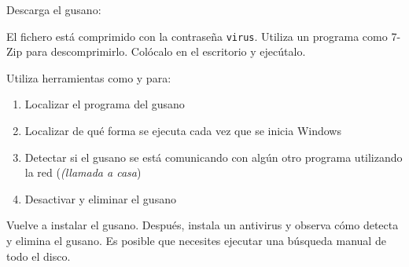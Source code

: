 \begin{homeworkProblem}
  Descarga el gusano:

  \begin{center}
    \begin{minipage}{.8\textwidth}
      \begin{center}
      \end{center}
    \end{minipage}
  \end{center}
  

  El fichero está comprimido con la contraseña \texttt{virus}. Utiliza un programa como 7-Zip para descomprimirlo. Colócalo en el escritorio y ejecútalo.
\end{homeworkProblem}

\begin{homeworkProblem}
  Utiliza herramientas como  y  para:
  \begin{enumerate}
  \item Localizar el programa del gusano
  \item Localizar de qué forma se ejecuta cada vez que se inicia Windows
  \item Detectar si el gusano se está comunicando con algún otro programa utilizando la red (\textit{(llamada a casa})
  \item Desactivar y eliminar el gusano
  \end{enumerate}

\end{homeworkProblem}


\begin{homeworkProblem}
  Vuelve a instalar el gusano. Después, instala un antivirus y observa cómo detecta y elimina el gusano. Es posible que necesites ejecutar una búsqueda manual de todo el disco.
\end{homeworkProblem}


